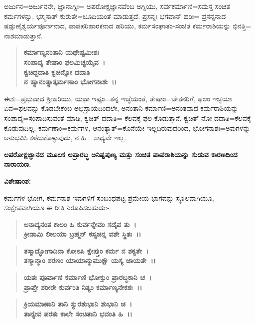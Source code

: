 ಅರ್ಜುನ=ಅರ್ಜುನನೇ, ಜ್ಞಾನಾಗ್ನಿಃ= ಅಪರೋಕ್ಷಜ್ಞಾನವೆಂಬ ಅಗ್ನಿಯು, ಸರ್ವ\break ಕರ್ಮಾಣಿ=ಸಮಸ್ತ ಸಂಚಿತ ಕರ್ಮಗಳನ್ನು, ಭಸ್ಮಸಾತ್ ಕುರುತೇ=ಬೂದಿಯಂತೆ ಮಾಡುತ್ತದೆ. ಪ್ರಸನ್ನಃ ಭಗವಾನ್ ಹರಿಃ= ಪ್ರಸನ್ನನಾದ ಷಡ್ಗುಣೈಶ್ವರ್ಯಪೂರ್ಣನಾದ, ಪಾಪಪರಿಹಾರಕನಾದ ಹರಿಯು, ಕರ್ಮಸಂಘಾತಂ-ಸಂಚಿತ ಕರ್ಮರಾಶಿಯನ್ನು ಭಿನತ್ತಿ= ನಾಶಮಾಡುತ್ತಾನೆ.

\begin{verse}
\textbf{ಕರ್ಮಾಣ್ಯನಂತಾನಿ ಯಥೇಷ್ಟಮೀಶಃ}\\\textbf{ಸಂಪಾದ್ಯ ತೇಷಾಂ ಫಲಮಿಚ್ಛಯೈವ~।}\\\textbf{ಕ್ವಚಿದ್ದದಾತಿ ಕ್ವಚಿನ್ನೋ ದದಾತಿ}\\\textbf{ನ ಹ್ಯಾನಂತ್ಯಾತ್ಕರ್ಮಣಾಂ ಭೋಗನಾಶಃ~।।}
\end{verse}

ಈಶಃ=ಪ್ರಭುವಾದ ಶ‍್ರೀಹರಿಯು, ಯಥಾ ಇಷ್ಟಂ=ತನ್ನ ಇಚ್ಛೆಯಂತೆ, ತೇಷಾಂ=ಚೇತನ\-ರಿಗೆ, ಫಲಂ ಇಚ್ಛಯಾ ಏವ=ಫಲವನ್ನು ಕೊಡಬೇಕೆಂಬ ಅಭಿಪ್ರಾಯದಿಂದಲೇ, ಅನಂತಾನಿ ಕರ್ಮಾಣಿ=ಅನಂತವಾದ ಕರ್ಮರಾಶಿಯನ್ನು ಸಂಪಾದ್ಯ=ಸಂಪಾದಿಸುವಂತೆ ಮಾಡಿ, ಕ್ವಚಿತ್ ದದಾತಿ= ಕೆಲವಕ್ಕೆ ಫಲ ಕೊಡುತ್ತಾನೆ, ಕ್ವಚಿತ್ ನೋ ದದಾತಿ=ಕೆಲವಕ್ಕೆ ಕೊಡುವುದಿಲ್ಲ, ಕರ್ಮಣಾಂ=ಕರ್ಮಗಳ, ಆನಂತ್ಯಾತ್=ಕೊನೆಯೇ ಇಲ್ಲದಿರುವುದರಿಂದ, ಭೋಗನಾಶಃ=\-ಅವುಗಳನ್ನು ಅನುಭವಿಸಿ ಕಳೆದುಕೊಳ್ಳುವುದು, ನ ಹಿ= ಸಾಧ್ಯವೇ ಇಲ್ಲ.

\begin{center}
\textbf{ಅಪರೋಕ್ಷಜ್ಞಾನದ ಮೂಲಕ ಅಪ್ರಾರಬ್ಧ ಅನಿಷ್ಟಪುಣ್ಯ ಮತ್ತು ಸಂಚಿತ ಪಾಪರಾಶಿಯನ್ನು ಸುಡುವ ಕಾರಣದಿಂದ ನಾರಾಯಣ.}
\end{center}

\noindent
\textbf{ವಿಶೇಷಾಂಶ:\enginline{-}}

ಕರ್ಮಗಳ ಭೋಗ, ಕರ್ಮನಾಶ ಇವುಗಳಿಗೆ ಸಂಬಂಧಪಟ್ಟ ಪ್ರಮೇಯ ಭಾಗವನ್ನು ಸ್ಥೂಲವಾಗಿಯೂ, ಸಂಕ್ಷೇಪವಾಗಿಯೂ ಈ ರೀತಿ ನಿರೂಪಿಸಬಹುದು:-

\begin{verse}
\textbf{ಅನಾದ್ಯನಂತ ಕಾಲಂ ಹಿ ಕುರ್ವನ್ನೇವಂ ಸದೈವ ತು~।}\\\textbf{ಕ್ರೀಡಾಮಿ ಲೀಲಯಾ ಬ್ರಹ್ಮನ್ ಕಸ್ಯಚಿನ್ನ ವಶೇ ಸ್ಥಿತಃ~।।}
\end{verse}

\begin{verse}
\textbf{ತಸ್ಮಾದ್ಭೋಗಾದಿನಾ ಕೋಽಪಿ ಕ್ಷೇಪ್ತುಂ ಕರ್ಮ ನ ಶಕ್ಯತೇ~।}\\\textbf{ತಸ್ಮಾನ್ಮಾಂ ಶರಣಂ ಯಾಯಾನ್ಮುಮುಕ್ಷೌ ಯಸ್ಯ ಜಾಯತೇ~।।}
\end{verse}

\begin{verse}
\textbf{ಯತಃ ಪೂರ್ವಾಣಿ ಕರ್ಮಾಣಿ ಭೋಕ್ತುಂ ಪ್ರಾರಬ್ಧಕಾನಿ ಚ~।}\\\textbf{ಪ್ರಾಪ್ತೇ ಶರೀರೇ ಕುರ್ವಂತಿ ನಿತ್ಯಂ ಕರ್ಮಾಣ್ಯನೇಕಶಃ~।।}
\end{verse}

\begin{verse}
\textbf{ಕ್ರಿಯಮಾಣಾನಿ ತಾನಿ ಸ್ಯುರಶುಭಾನಿ ಶುಭಾನಿ ಚ~।}\\\textbf{ತಾನ್ಯೇವ ಪರತಃ ಕಾಲೇ ಸಂಚಿತಾನಿ ಭವಂತಿ ಹಿ~।।}
\end{verse}

